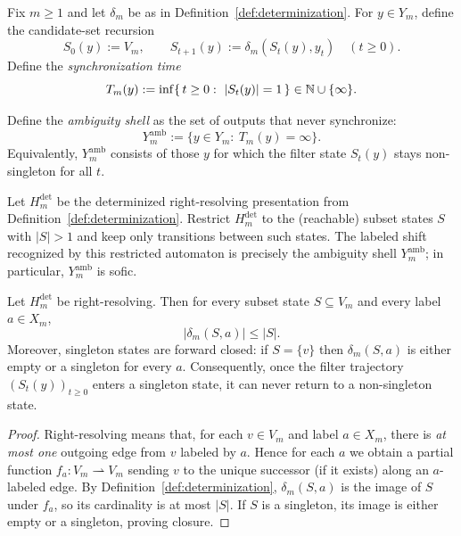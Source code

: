 \begin{definition}\label{def:sync-time}
Fix $m\ge 1$ and let $\delta_m$ be as in Definition~\ref{def:determinization}.
For $y\in Y_m$, define the candidate-set recursion
\[
S_0(y):=V_m,\qquad S_{t+1}(y):=\delta_m(S_t(y),y_t)\quad(t\ge 0).
\]
Define the \emph{synchronization time}
\[
T_m(y):=\inf\{\,t\ge 0:\ |S_t(y)|=1\,\}\in\NN\cup\{\infty\}.
\]
\end{definition}

\begin{definition}\label{def:ambiguity-shell}
Define the \emph{ambiguity shell} as the set of outputs that never synchronize:
\[
Y_m^{\mathrm{amb}}:=\{y\in Y_m:\ T_m(y)=\infty\}.
\]
Equivalently, $Y_m^{\mathrm{amb}}$ consists of those $y$ for which the filter state $S_t(y)$ stays non-singleton for all $t$.
\end{definition}

\begin{remark}\label{rem:amb-shell-sofic}
Let $H_m^{\mathrm{det}}$ be the determinized right-resolving presentation from Definition~\ref{def:determinization}.
Restrict $H_m^{\mathrm{det}}$ to the (reachable) subset states $S$ with $|S|>1$ and keep only transitions between such states.
The labeled shift recognized by this restricted automaton is precisely the ambiguity shell $Y_m^{\mathrm{amb}}$; in particular, $Y_m^{\mathrm{amb}}$ is sofic.
\end{remark}

\begin{proposition}\label{prop:candidate-set-monotone}
Let $H_m^{\mathrm{det}}$ be right-resolving.
Then for every subset state $S\subseteq V_m$ and every label $a\in X_m$,
\[
|\delta_m(S,a)|\le |S|.
\]
Moreover, singleton states are forward closed: if $S=\{v\}$ then $\delta_m(S,a)$ is either empty or a singleton for every $a$.
Consequently, once the filter trajectory $(S_t(y))_{t\ge 0}$ enters a singleton state, it can never return to a non-singleton state.
\end{proposition}
\begin{proof}
Right-resolving means that, for each $v\in V_m$ and label $a\in X_m$, there is \emph{at most one} outgoing edge from $v$ labeled by $a$.
Hence for each $a$ we obtain a partial function $f_a:V_m\rightharpoonup V_m$ sending $v$ to the unique successor (if it exists) along an $a$-labeled edge.
By Definition~\ref{def:determinization}, $\delta_m(S,a)$ is the image of $S$ under $f_a$, so its cardinality is at most $|S|$.
If $S$ is a singleton, its image is either empty or a singleton, proving closure.
\end{proof}

